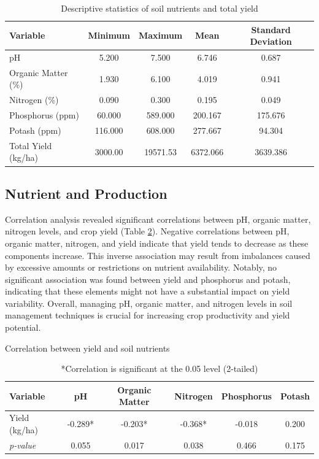 \begin{table}[H]
    \centering
    \caption{Descriptive statistics of soil nutrients and total yield}
    \label{tab:descriptive_statistics}
    \begin{tabular}{lcccc}
        \toprule
        \textbf{Variable} & \textbf{Minimum} & \textbf{Maximum} & \textbf{Mean} & \textbf{Standard Deviation} \\
        \midrule
        pH & 5.200 & 7.500 & 6.746 & 0.687 \\
        Organic Matter (\%) & 1.930 & 6.100 & 4.019 & 0.941 \\
        Nitrogen (\%) & 0.090 & 0.300 & 0.195 & 0.049 \\
        Phosphorus (ppm) & 60.000 & 589.000 & 200.167 & 175.676 \\
        Potash (ppm) & 116.000 & 608.000 & 277.667 & 94.304 \\
        Total Yield (kg/ha) & 3000.00 & 19571.53 & 6372.066 & 3639.386 \\
        \bottomrule
    \end{tabular}
\end{table}

\subsection{Nutrient and Production}

Correlation analysis revealed significant correlations between pH, organic matter, nitrogen levels, and crop yield (Table \ref{tab:correlation}). Negative correlations between pH, organic matter, nitrogen, and yield indicate that yield tends to decrease as these components increase. This inverse association may result from imbalances caused by excessive amounts or restrictions on nutrient availability. Notably, no significant association was found between yield and phosphorus and potash, indicating that these elements might not have a substantial impact on yield variability. Overall, managing pH, organic matter, and nitrogen levels in soil management techniques is crucial for increasing crop productivity and yield potential.

\begin{table}[H]
    \centering
    \caption{Correlation between yield and soil nutrients}
    \label{tab:correlation}
    \begin{tabular}{lccccc}
        \toprule
        \textbf{Variable} & \textbf{pH} & \textbf{Organic Matter} & \textbf{Nitrogen} & \textbf{Phosphorus} & \textbf{Potash} \\
        \midrule
        Yield (kg/ha) & -0.289* & -0.203* & -0.368* & -0.018 & 0.200 \\
        \textit{p-value} & 0.055 & 0.017 & 0.038 & 0.466 & 0.175 \\
        \bottomrule
    \end{tabular}
    \caption*{*Correlation is significant at the 0.05 level (2-tailed)}
\end{table}

